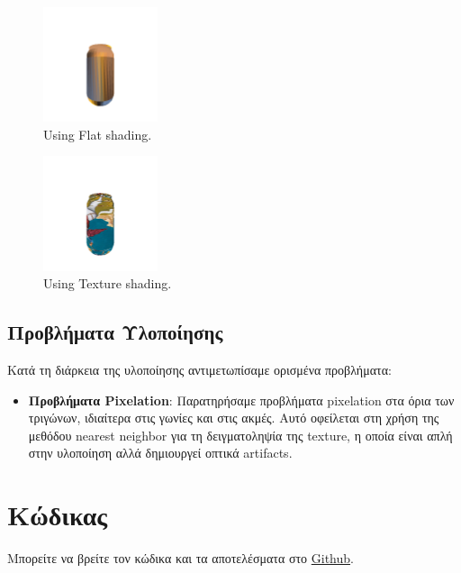 \documentclass{article}
\begin{document}
\begin{figure}[H] %
\centering
\includegraphics[width=0.3\textwidth]{flat_shading.png}
\caption{\label{fig:flat}Using Flat shading.}
\end{figure}

\begin{figure}[H] %
    \centering
    \includegraphics[width=0.3\textwidth]{texture_shading.png}
    \caption{\label{fig:texture}Using Texture shading.}
\end{figure}

\subsection{Προβλήματα Υλοποίησης}
Κατά τη διάρκεια της υλοποίησης αντιμετωπίσαμε ορισμένα προβλήματα:

\begin{itemize}
    \item \textbf{Προβλήματα Pixelation}: Παρατηρήσαμε προβλήματα pixelation στα όρια των τριγώνων, ιδιαίτερα στις γωνίες και στις ακμές. Αυτό οφείλεται στη χρήση της μεθόδου nearest neighbor για τη δειγματοληψία της texture, η οποία είναι απλή στην υλοποίηση αλλά δημιουργεί οπτικά artifacts.
    
\end{itemize}

\section{Κώδικας}
Μπορείτε να βρείτε τον κώδικα και τα αποτελέσματα στο \href{https://github.com/charisvt/cg-hw1-v4}{Github}.
\end{document}
